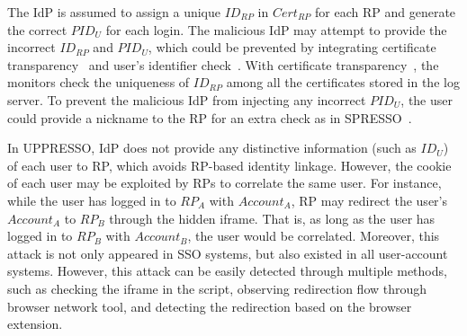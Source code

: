 



 The IdP is assumed to assign a unique $ID_{RP}$ in $Cert_{RP}$ for each RP and generate the correct $PID_U$ for each login. The malicious IdP may attempt to provide the incorrect $ID_{RP}$ and $PID_U$, which could be prevented by integrating certificate transparency~\cite{rfc6962} and user's identifier check~\cite{SPRESSO}. With certificate transparency~\cite{rfc6962}, the monitors  check the uniqueness of $ID_{RP}$ among all the certificates stored in the log server. To prevent the malicious IdP from injecting any incorrect $PID_U$, the user could provide a nickname to the RP for an extra check as in SPRESSO~\cite{SPRESSO}.

In UPPRESSO, IdP does not provide any distinctive information (such as $ID_U$) of each user to RP, which avoids RP-based identity linkage. However, the cookie of each user may be exploited by RPs to correlate the same user. For instance, while the user has logged in to $RP_A$ with $Account_A$, RP may redirect the user's $Account_A$ to $RP_B$ through the hidden iframe. That is, as long as the user has logged in to $RP_B$ with $Account_B$, the user would be correlated. Moreover, this attack is not only appeared in SSO systems, but also existed in all user-account systems. However, this attack can be easily detected through multiple methods, such as checking the iframe in the script, observing redirection flow through browser network tool, and detecting the redirection based on the browser extension.